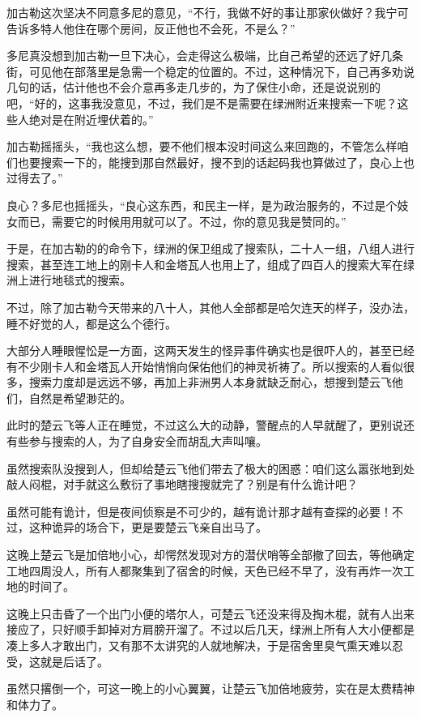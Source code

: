 加古勒这次坚决不同意多尼的意见，“不行，我做不好的事让那家伙做好？我宁可告诉多特人他住在哪个房间，反正他也不会死，不是么？”

多尼真没想到加古勒一旦下决心，会走得这么极端，比自己希望的还远了好几条街，可见他在部落里是急需一个稳定的位置的。不过，这种情况下，自己再多劝说几句的话，估计他也不会介意再多走几步的，为了保住小命，还是说说别的吧，“好的，这事我没意见，不过，我们是不是需要在绿洲附近来搜索一下呢？这些人绝对是在附近埋伏着的。”

加古勒摇摇头，“我也这么想，要不他们根本没时间这么来回跑的，不管怎么样咱们也要搜索一下的，能搜到那自然最好，搜不到的话起码我也算做过了，良心上也过得去了。”

良心？多尼也摇摇头，“良心这东西，和民主一样，是为政治服务的，不过是个妓女而已，需要它的时候用用就可以了。不过，你的意见我是赞同的。”

于是，在加古勒的的命令下，绿洲的保卫组成了搜索队，二十人一组，八组人进行搜索，甚至连工地上的刚卡人和金塔瓦人也用上了，组成了四百人的搜索大军在绿洲上进行地毯式的搜索。

不过，除了加古勒今天带来的八十人，其他人全部都是哈欠连天的样子，没办法，睡不好觉的人，都是这么个德行。

大部分人睡眼惺忪是一方面，这两天发生的怪异事件确实也是很吓人的，甚至已经有不少刚卡人和金塔瓦人开始悄悄向保佑他们的神灵祈祷了。所以搜索的人看似很多，搜索力度却是远远不够，再加上非洲男人本身就缺乏耐心，想搜到楚云飞他们，自然是希望渺茫的。

此时的楚云飞等人正在睡觉，不过这么大的动静，警醒点的人早就醒了，更别说还有些参与搜索的人，为了自身安全而胡乱大声叫嚷。

虽然搜索队没搜到人，但却给楚云飞他们带去了极大的困惑：咱们这么嚣张地到处敲人闷棍，对手就这么敷衍了事地瞎搜搜就完了？别是有什么诡计吧？

虽然可能有诡计，但是夜间侦察是不可少的，越有诡计那才越有查探的必要！不过，这种诡异的场合下，更是要楚云飞亲自出马了。

这晚上楚云飞是加倍地小心，却愕然发现对方的潜伏哨等全部撤了回去，等他确定工地四周没人，所有人都聚集到了宿舍的时候，天色已经不早了，没有再炸一次工地的时间了。

这晚上只击昏了一个出门小便的塔尔人，可楚云飞还没来得及掏木棍，就有人出来接应了，只好顺手卸掉对方肩膀开溜了。不过以后几天，绿洲上所有人大小便都是凑上多人才敢出门，又有那不太讲究的人就地解决，于是宿舍里臭气熏天难以忍受，这就是后话了。

虽然只撂倒一个，可这一晚上的小心翼翼，让楚云飞加倍地疲劳，实在是太费精神和体力了。

